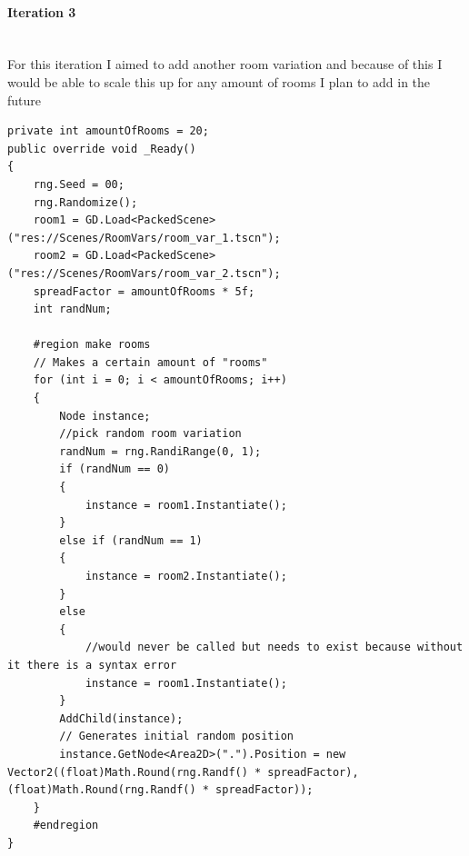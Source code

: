 \documentclass{article}
\newcommand{\myparagraph}[1]{\paragraph{#1}\mbox{}\\} %
\begin{document}
\myparagraph{Iteration 3}
For this iteration I aimed to add another room variation and because of this I would be able to scale this up for any amount of rooms I plan to add in the future
\begin{lstlisting}
private int amountOfRooms = 20;
public override void _Ready()
{
    rng.Seed = 00;
    rng.Randomize();  
    room1 = GD.Load<PackedScene>("res://Scenes/RoomVars/room_var_1.tscn");
    room2 = GD.Load<PackedScene>("res://Scenes/RoomVars/room_var_2.tscn");
    spreadFactor = amountOfRooms * 5f;
    int randNum;
    
    #region make rooms
    // Makes a certain amount of "rooms"
    for (int i = 0; i < amountOfRooms; i++)
    {
        Node instance;
        //pick random room variation
        randNum = rng.RandiRange(0, 1);
        if (randNum == 0)
        {
            instance = room1.Instantiate();
        }
        else if (randNum == 1)
        {
            instance = room2.Instantiate();
        }
        else
        {
        	//would never be called but needs to exist because without it there is a syntax error
            instance = room1.Instantiate();
        }
        AddChild(instance);
        // Generates initial random position
        instance.GetNode<Area2D>(".").Position = new Vector2((float)Math.Round(rng.Randf() * spreadFactor), (float)Math.Round(rng.Randf() * spreadFactor)); 
    }
    #endregion
}
\end{lstlisting}
\end{document}
